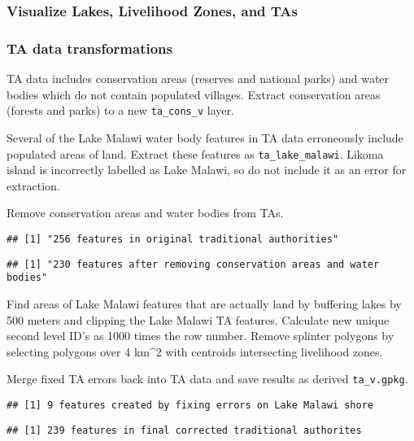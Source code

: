 \documentclass[
]{article}
\begin{document}
\hypertarget{visualize-lakes-livelihood-zones-and-tas}{%
\subsubsection{Visualize Lakes, Livelihood Zones, and
TAs}\label{visualize-lakes-livelihood-zones-and-tas}}

\hypertarget{ta-data-transformations}{%
\subsubsection{TA data transformations}\label{ta-data-transformations}}

TA data includes conservation areas (reserves and national parks) and
water bodies which do not contain populated villages. Extract
conservation areas (forests and parks) to a new \texttt{ta\_cons\_v}
layer.

Several of the Lake Malawi water body features in TA data erroneously
include populated areas of land. Extract these features as
\texttt{ta\_lake\_malawi}. Likoma island is incorrectly labelled as Lake
Malawi, so do not include it as an error for extraction.

Remove conservation areas and water bodies from TAs.

\begin{verbatim}
## [1] "256 features in original traditional authorities"
\end{verbatim}

\begin{verbatim}
## [1] "230 features after removing conservation areas and water bodies"
\end{verbatim}

Find areas of Lake Malawi features that are actually land by buffering
lakes by 500 meters and clipping the Lake Malawi TA features. Calculate
new unique second level ID's as 1000 times the row number. Remove
splinter polygons by selecting polygons over 4 km\^{}2 with centroids
intersecting livelihood zones.

Merge fixed TA errors back into TA data and save results as derived
\texttt{ta\_v.gpkg}.

\begin{verbatim}
## [1] 9 features created by fixing errors on Lake Malawi shore
\end{verbatim}

\begin{verbatim}
## [1] 239 features in final corrected traditional authorites
\end{verbatim}
\end{document}
